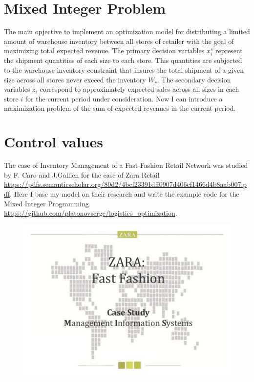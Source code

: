 \documentclass[11pt,fleqn]{book} %
\begin{document}
\begin{itemize}
\section{Mixed Integer Problem}
The main opjective to implement an optimization model for distributing a limited amount of warehouse inventory between all stores of retailer with the goal of maximizing total expected revenue. The primary decision variables $x_i^s$ represent the shipment quantities of each size to each store. This quantities are subjected to the warehouse inventory constraint that insures the total shipment of a given size across all stores never exceed the inventory $W_s$. The secondary decision variables $z_i$ correspond to approximately expected sales across all sizes in each store $i$ for the current period under consideration. Now I can introduce a maximization problem of the sum of expected revenues in the current period.



\section{Control values}







\begin{remark}
The case of Inventory Management of a Fast-Fashion
Retail Network was studied by F. Caro and J.Gallien for the case of Zara Retail \url{https://pdfs.semanticscholar.org/80d2/4bcf23391dff0907d406cf1466d4b8aab007.pdf}. Here I base my model on their research
and write the example code for the Mixed Integer Programming \url{https://github.com/platonovserge/logistics_optimization}.
\begin{figure}[h]
\center
\includegraphics[width=0.4\linewidth]{Pictures/zara}
\end{figure}


\end{remark}
\end{itemize}
\end{document}
